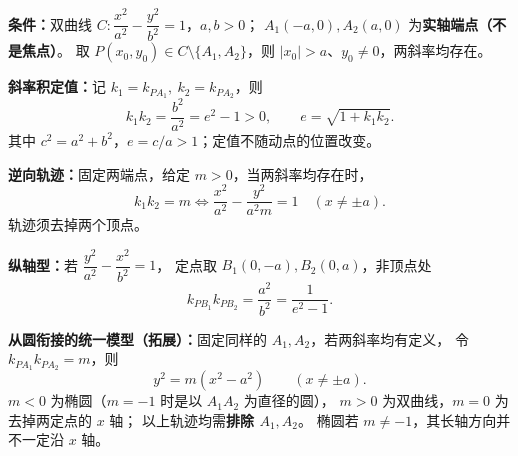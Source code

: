 \begin{statementbox}
\textbf{条件：}双曲线 $C:\dfrac{x^2}{a^2}-\dfrac{y^2}{b^2}=1$，$a,b>0$；
$A_1(-a,0),A_2(a,0)$ 为\textbf{实轴端点（不是焦点）}。
取 $P(x_0,y_0)\in C\setminus\{A_1,A_2\}$，则 $|x_0|>a$、$y_0\ne0$，两斜率均存在。
\begin{center}\end{center}
\textbf{斜率积定值：}记 $k_1=k_{PA_1},\ k_2=k_{PA_2}$，则
\[
\boxed{k_1k_2=\frac{b^2}{a^2}=e^2-1>0},\qquad
\boxed{e=\sqrt{1+k_1k_2}}.
\]
其中 $c^2=a^2+b^2$，$e=c/a>1$；定值不随动点的位置改变。

\textbf{逆向轨迹：}固定两端点，给定 $m>0$，当两斜率均存在时，
\[
 k_1k_2=m\iff \frac{x^2}{a^2}-\frac{y^2}{a^2m}=1\quad(x\ne\pm a).
\]
轨迹须去掉两个顶点。

\textbf{纵轴型：}若 $\dfrac{y^2}{a^2}-\dfrac{x^2}{b^2}=1$，
定点取 $B_1(0,-a),B_2(0,a)$，非顶点处
\[
\boxed{k_{PB_1}k_{PB_2}=\frac{a^2}{b^2}=\frac1{e^2-1}}.
\]

\medskip
\textbf{从圆衔接的统一模型（拓展）：}固定同样的 $A_1,A_2$，若两斜率均有定义，
令 $k_{PA_1}k_{PA_2}=m$，则
\[
\boxed{y^2=m(x^2-a^2)}\qquad(x\ne\pm a).
\]
$m<0$ 为椭圆（$m=-1$ 时是以 $A_1A_2$ 为直径的圆），
$m>0$ 为双曲线，$m=0$ 为去掉两定点的 $x$ 轴；
以上轨迹均需\textbf{排除 $A_1,A_2$}。
椭圆若 $m\ne-1$，其长轴方向并不一定沿 $x$ 轴。

\end{statementbox}

